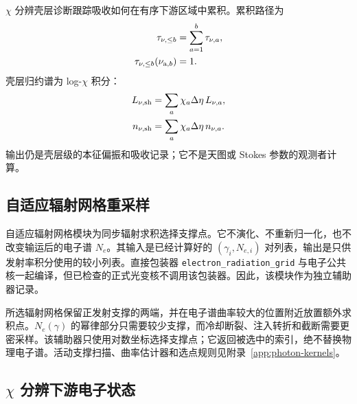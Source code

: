 \documentclass[twocolumn]{aastex702}
\begin{document}
\(\chi\) 分辨壳层诊断跟踪吸收如何在有序下游区域中累积。累积路径为
\begin{equation}
\begin{aligned}
\tau_{\nu,\le b}&=\sum_{a=1}^b\tau_{\nu,a},\\
\tau_{\nu,\le b}(\nu_{{\rm a},b})&=1.
\end{aligned}
\end{equation}
壳层归约谱为 log-\(\chi\) 积分：
\begin{equation}
\begin{aligned}
L_{\nu,{\rm sh}}&=\sum_a \chi_a\Delta\eta\,L_{\nu,a},\\
n_{\nu,{\rm sh}}&=\sum_a \chi_a\Delta\eta\,n_{\nu,a}.
\end{aligned}
\end{equation}
输出仍是壳层级的本征偏振和吸收记录；它不是天图或 Stokes 参数的观测者计算。

\subsection{自适应辐射网格重采样}

自适应辐射网格模块为同步辐射求积选择支撑点。它不演化、不重新归一化，也不改变输运后的电子谱 \(N_e\)。其输入是已经计算好的 \((\gamma_i,N_{e,i})\) 对列表，输出是只供发射率积分使用的较小列表。直接包装器 \texttt{electron\_radiation\_grid} 与电子公共核一起编译，但已检查的正式光变核不调用该包装器。因此，该模块作为独立辅助器记录。

所选辐射网格保留正发射支撑的两端，并在电子谱曲率较大的位置附近放置额外求积点。\(N_e(\gamma)\) 的幂律部分只需要较少支撑，而冷却断裂、注入转折和截断需要更密采样。该辅助器只使用对数坐标选择支撑点；它返回被选中的索引，绝不替换物理电子谱。活动支撑扫描、曲率估计器和选点规则见附录~\ref{app:photon-kernels}。

\subsection{\texorpdfstring{\(\chi\)}{chi} 分辨下游电子状态}
\end{document}

